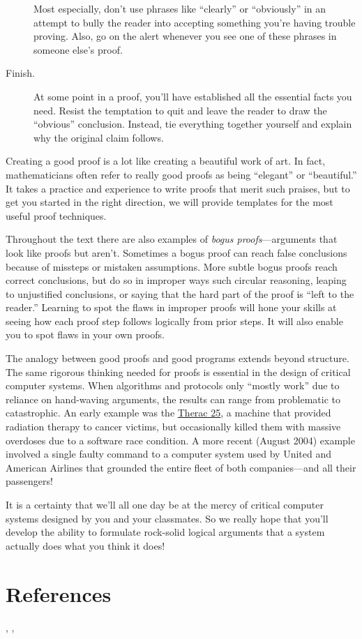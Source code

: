 \begin{description}
  Most especially, don't use phrases like ``clearly'' or ``obviously'' in
  an attempt to bully the reader into accepting something you're having
  trouble proving.  Also, go on the alert whenever you see one of these
  phrases in someone else's proof.

\item[Finish.]  At some point in a proof, you'll have established all the
essential facts you need.  Resist the temptation to quit and leave the
reader to draw the ``obvious'' conclusion.  Instead, tie everything
together yourself and explain why the original claim follows.

\end{description}

Creating a good proof is a lot like creating a beautiful work of art.  In
fact, mathematicians often refer to really good proofs as being
``elegant'' or ``beautiful.''  It takes a practice and experience to write
proofs that merit such praises,  but to get you started in
the right direction, we will provide templates for the most useful proof
techniques.

Throughout the text there are also examples of \emph{bogus proofs}---arguments 
that look like proofs but aren't.  Sometimes a bogus
proof can reach false conclusions because of missteps or mistaken
assumptions.  More subtle bogus proofs reach correct conclusions, but
do so in improper ways such circular reasoning, leaping to
unjustified conclusions, or saying that the hard part of the
proof is ``left to the reader.''  Learning to spot the flaws in improper
proofs will hone your skills at seeing how each proof step follows
logically from prior steps.  It will also enable you to spot flaws in
your own proofs.

The analogy between good proofs and good programs extends beyond
structure.  The same rigorous thinking needed for proofs is essential in
the design of critical computer systems.  When algorithms and protocols
only ``mostly work'' due to reliance on hand-waving arguments, the results
can range from problematic to catastrophic.  An early example was the
\href{http://sunnyday.mit.edu/papers/therac.pdf}{Therac 25}, 
a machine that provided radiation therapy to cancer victims,
but occasionally killed them with massive overdoses due to a software race
condition.  A more recent (August 2004) example involved a single faulty
command to a computer system used by United and American Airlines that
grounded the entire fleet of both companies---and all their passengers!

It is a certainty that we'll all one day be at the mercy of critical
computer systems designed by you and your classmates.  So we really
hope that you'll develop the ability to formulate rock-solid logical
arguments that a system actually does what you think it does!

\section{References}

\cite{MR1818534}, \cite{MR1723092}, \cite{Velleman1994}


\endinput
